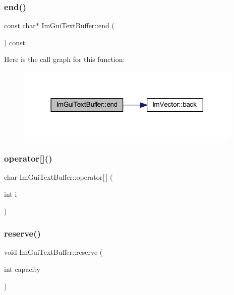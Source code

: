\subsubsection{\texorpdfstring{end()}{end()}}
{\footnotesize\ttfamily const char$\ast$ Im\+Gui\+Text\+Buffer\+::end (\begin{DoxyParamCaption}{ }\end{DoxyParamCaption}) const\hspace{0.3cm}{\ttfamily [inline]}}

Here is the call graph for this function\+:
\nopagebreak
\begin{figure}[H]
\begin{center}
\leavevmode
\includegraphics[width=306pt]{struct_im_gui_text_buffer_a2fc30ad0d384f98dfcea722f798d91f2_cgraph}
\end{center}
\end{figure}
\mbox{\label{struct_im_gui_text_buffer_a8550f53463fd12711e3d08b740227bd4}} 
\subsubsection{\texorpdfstring{operator[]()}{operator[]()}}
{\footnotesize\ttfamily char Im\+Gui\+Text\+Buffer\+::operator\mbox{[}$\,$\mbox{]} (\begin{DoxyParamCaption}\item[{int}]{i }\end{DoxyParamCaption})\hspace{0.3cm}{\ttfamily [inline]}}

\mbox{\label{struct_im_gui_text_buffer_a3271f361e0f1997f4c3eb77665fdf161}} 
\subsubsection{\texorpdfstring{reserve()}{reserve()}}
{\footnotesize\ttfamily void Im\+Gui\+Text\+Buffer\+::reserve (\begin{DoxyParamCaption}\item[{int}]{capacity }\end{DoxyParamCaption})\hspace{0.3cm}{\ttfamily [inline]}}

